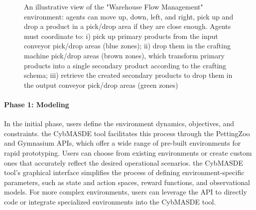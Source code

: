\documentclass[sigconf,anonymous]{aamas}
\begin{document}


\begin{figure}
  \centering
  
  \caption{An illustrative view of the "Warehouse Flow Management" environment: agents can move up, down, left, and right, pick up and drop a product in a pick/drop area if they are close enough. Agents must coordinate to: i) pick up primary products from the input conveyor pick/drop areas (blue zones); ii) drop them in the crafting machine pick/drop areas (brown zones), which transform primary products into a single secondary product according to the crafting schema; iii) retrieve the created secondary products to drop them in the output conveyor pick/drop areas (green zones)}
  \label{fig:warehouse}
\end{figure}


\paragraph{Phase 1: Modeling}

In the initial phase, users define the environment dynamics, objectives, and constraints. the CybMASDE tool facilitates this process through the PettingZoo and Gymnasium APIs, which offer a wide range of pre-built environments for rapid prototyping. Users can choose from existing environments or create custom ones that accurately reflect the desired operational scenarios. the CybMASDE tool's graphical interface simplifies the process of defining environment-specific parameters, such as state and action spaces, reward functions, and observational models. For more complex environments, users can leverage the API to directly code or integrate specialized environments into the CybMASDE tool.
\end{document}
